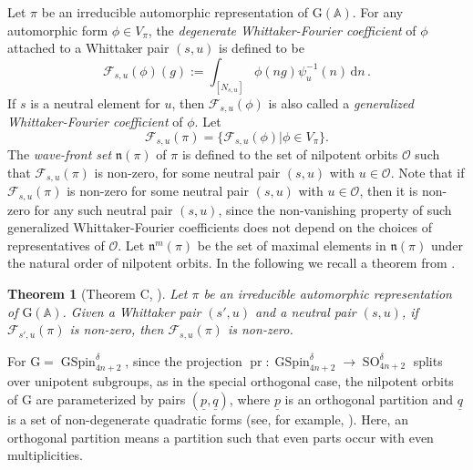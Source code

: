 \documentclass[12pt]{amsart}
\newcommand{\A}{\mathbb{A}}
\newcommand{\RG}{{\mathrm {G}}}
\newtheorem{theorem}{Theorem}[section]
\theoremstyle{remark}
\newcommand{\pr}{\operatorname{pr}}
\DeclareMathOperator{\SO}{SO}
\DeclareMathOperator{\GSpin}{GSpin}
\begin{document}
Let $\pi$ be an irreducible automorphic representation of $\RG(\A)$. For any automorphic form $\phi \in V_\pi$, the {\it degenerate Whittaker-Fourier coefficient} of $\phi$ attached to a Whittaker pair $(s,u)$ is defined to be
\begin{equation}
\label{eq-GomezGourevitchSahi-degenerateWhittakerFC}
\mathcal{F}_{s,u}(\phi)(g):=\int_{[N_{s,u}]} \phi(ng) \psi_u^{-1}(n) \, \mathrm{d}n\,.
\end{equation}
If $s$ is a neutral element for $u$, then $\mathcal{F}_{s,u}(\phi)$ is also called a {\it generalized Whittaker-Fourier coefficient} of $\phi$.
Let 
\begin{equation*}
\mathcal{F}_{s,u}(\pi)=\{\mathcal{F}_{s,u}(\phi)|\phi \in V_\pi\}.	
\end{equation*}
The {\it wave-front set} $\mathfrak{n}(\pi)$ of $\pi$ is defined to the set of nilpotent orbits $\mathcal{O}$ such that $\mathcal{F}_{s,u}(\pi)$ is non-zero, for some neutral pair $(s,u)$ with $u \in \mathcal{O}$. Note that if $\mathcal{F}_{s,u}(\pi)$ is non-zero for some neutral pair $(s,u)$ with $u \in \mathcal{O}$, then it is non-zero for any such neutral pair $(s,u)$, since the non-vanishing property of such generalized Whittaker-Fourier coefficients does not depend on the choices of representatives of $\mathcal{O}$.
Let $\mathfrak{n}^m(\pi)$ be the set of maximal elements in $\mathfrak{n}(\pi)$ under the natural order of nilpotent orbits.
In the following we recall a theorem from \cite{GomezGourevitchSahi2017}.

\begin{theorem}[Theorem C, \cite{GomezGourevitchSahi2017}]\label{thm-GomezGourevitchSahi-global1}
Let $\pi$ be an irreducible automorphic representation of $\RG(\A)$.
Given a Whittaker pair $(s',u)$ and a neutral pair $(s,u)$, if $\mathcal{F}_{s',u}(\pi)$ is non-zero, then $\mathcal{F}_{s,u}(\pi)$ is non-zero.
\end{theorem}

For $\RG=\GSpin_{4n+2}^\delta$, since the projection $\pr:\GSpin_{4n+2}^\delta\to \SO_{4n+2}^{\delta}$ splits over unipotent subgroups, as in the special orthogonal case, the nilpotent orbits of $\RG$ are parameterized by pairs $(\underline{p}, \underline{q})$, where $\underline{p}$ is an orthogonal partition and $\underline{q}$ is a set of non-degenerate quadratic forms (see, for example, \cite[Section I.6]{Waldspurger2001Nilpotent}).  
Here, an orthogonal partition means a partition such that even parts occur with even multiplicities. 
\end{document}
